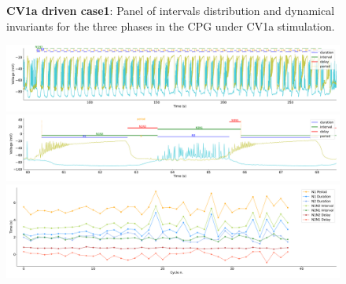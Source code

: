 \begin{figure}[htbp]
\begin{minipage}{0.9\textwidth}
\begin{minipage}[b]{0.53\textwidth}
\begin{minipage}[b]{\textwidth}
			\end{minipage}
		\end{minipage}
	\end{minipage}
	\caption{\textbf{CV1a driven case1}: Panel of intervals distribution and dynamical invariants for the three phases in the CPG under CV1a stimulation.}
	\label{fig:cv1a 1 3phases}
\end{figure}

\begin{figure}[htbp]
	\centering
	\begin{minipage}[b]{\textwidth}
		\centering
		\includegraphics[width=\textwidth,height=0.1\textheight]{./invariants/data/SUSSEX/CV1a_driven1/images/stim_cv1a1_signal_intervals_zoom.pdf}
		\includegraphics[width=\textwidth]{./invariants/data/SUSSEX/CV1a_driven1/images/stim_cv1a1_signal_intervals_cycle.pdf}
		\includegraphics[width=\textwidth]{./invariants/data/SUSSEX/CV1a_driven1/images/stim_cv1a1_time_cycle.pdf}
	\end{minipage}
	\begin{minipage}{0.9\textwidth}
		\centering
		\begin{minipage}[b]{0.43\textwidth}
			\centering

\end{minipage}
\end{minipage}
\end{figure}
